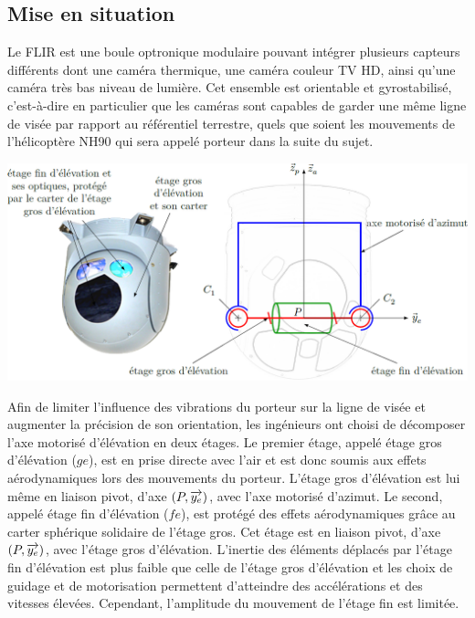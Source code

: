 \documentclass[10pt,fleqn]{article} %
\begin{document}

\vspace{4.5cm}
\pagestyle{fancy}
\thispagestyle{plain}


\def\columnseprulecolor{\color{ocre}}
\setlength{\columnseprule}{0.4pt} 

\ifprof
\else
\begin{multicols}{2}
\fi


\section*{Mise en situation}
Le FLIR est une boule optronique modulaire pouvant intégrer plusieurs capteurs différents dont une caméra
thermique, une caméra couleur TV HD, ainsi qu’une caméra très bas niveau de lumière. Cet ensemble est
orientable et gyrostabilisé, c’est-à-dire en particulier que les caméras sont capables de garder une même ligne
de visée par rapport au référentiel terrestre, quels que soient les mouvements de l’hélicoptère NH90 qui sera
appelé porteur dans la suite du sujet.


\begin{center}
\includegraphics[width=\linewidth]{images/fig_01}
\end{center}

Afin de limiter l’influence des vibrations du porteur sur la ligne de visée et augmenter la précision de son orientation,
les ingénieurs ont choisi de décomposer l’axe motorisé d’élévation en deux étages.
Le premier étage, appelé étage gros d’élévation ($ge$), est en prise directe avec l’air et est donc soumis aux effets
aérodynamiques lors des mouvements du porteur. L’étage gros d’élévation est lui même en liaison pivot, d’axe $\left(P,\overrightarrow{y_e}\right)$, avec l’axe motorisé d’azimut. Le second, appelé étage fin d’élévation ($fe$), est protégé des effets aérodynamiques grâce au carter sphérique solidaire de l’étage gros. Cet étage est en liaison pivot,
d’axe $\left(P,\overrightarrow{y_e}\right)$, avec l’étage gros d’élévation. L’inertie des éléments déplacés par l’étage fin d’élévation est plus faible
que celle de l’étage gros d’élévation et les choix de guidage et de motorisation permettent d’atteindre des accélérations
et des vitesses élevées. Cependant, l’amplitude du mouvement de l’étage fin est limitée. 




\end{multicols}
\end{document}
